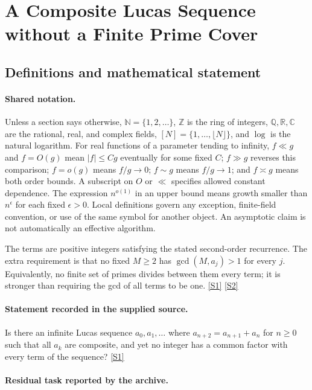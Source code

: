 \documentclass[11pt,a4paper]{article}
\newcommand{\N}{\mathbb{N}}
\newcommand{\Z}{\mathbb{Z}}
\newcommand{\Q}{\mathbb{Q}}
\newcommand{\R}{\mathbb{R}}
\newcommand{\C}{\mathbb{C}}
\newcommand{\sref}[2]{\hyperlink{source:#1:#2}{[S#2]}}
\begin{document}
\section{A Composite Lucas Sequence without a Finite Prime Cover}\label{statement}


\subsection{Definitions and mathematical statement}

\paragraph{Shared notation.}Unless a section says otherwise, $\N=\{1,2,\ldots\}$,
$\Z$ is the ring of integers, $\Q,\R,\C$ are the rational, real, and complex
fields, $[N]=\{1,\ldots,\lfloor N\rfloor\}$, and $\log$ is the natural
logarithm. For real functions of a parameter tending to infinity,
$f\ll g$ and $f=O(g)$ mean $|f|\leq Cg$ eventually for some fixed $C$;
$f\gg g$ reverses this comparison; $f=o(g)$ means $f/g\to0$;
$f\sim g$ means $f/g\to1$; and $f\asymp g$ means both order bounds.
A subscript on $O$ or $\ll$ specifies allowed constant dependence.
The expression $n^{o(1)}$ in an upper bound means growth smaller than
$n^\epsilon$ for each fixed $\epsilon>0$. Local definitions govern any
exception, finite-field convention, or use of the same symbol for another
object. An asymptotic claim is not automatically an effective algorithm.



The terms are positive integers satisfying the stated second-order recurrence. The extra requirement is that no fixed $M\geq2$ has $\gcd(M,a_j)>1$ for every $j$. Equivalently, no finite set of primes divides between them every term; it is stronger than requiring the gcd of all terms to be one. \sref{statement}{1} \sref{statement}{2}

\paragraph{Statement recorded in the supplied source.}
Is there an infinite Lucas sequence $a_0,a_1,\ldots$ where $a_{n+2}=a_{n+1}+a_n$ for $n\geq 0$ such that all $a_k$ are composite, and yet no integer has a common factor with every term of the sequence? \sref{statement}{1}

\paragraph{Residual task reported by the archive.}
\end{document}
